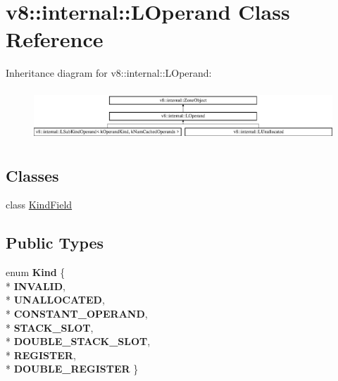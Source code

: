 \hypertarget{classv8_1_1internal_1_1_l_operand}{}\section{v8\+:\+:internal\+:\+:L\+Operand Class Reference}
\label{classv8_1_1internal_1_1_l_operand}
Inheritance diagram for v8\+:\+:internal\+:\+:L\+Operand\+:\begin{figure}[H]
\begin{center}
\leavevmode
\includegraphics[height=1.922197cm]{classv8_1_1internal_1_1_l_operand}
\end{center}
\end{figure}
\subsection*{Classes}
\begin{DoxyCompactItemize}
\item 
class \hyperlink{classv8_1_1internal_1_1_l_operand_1_1_kind_field}{Kind\+Field}
\end{DoxyCompactItemize}
\subsection*{Public Types}
\begin{DoxyCompactItemize}
\item 
enum {\bfseries Kind} \{ \\*
{\bfseries I\+N\+V\+A\+L\+ID}, 
\\*
{\bfseries U\+N\+A\+L\+L\+O\+C\+A\+T\+ED}, 
\\*
{\bfseries C\+O\+N\+S\+T\+A\+N\+T\+\_\+\+O\+P\+E\+R\+A\+ND}, 
\\*
{\bfseries S\+T\+A\+C\+K\+\_\+\+S\+L\+OT}, 
\\*
{\bfseries D\+O\+U\+B\+L\+E\+\_\+\+S\+T\+A\+C\+K\+\_\+\+S\+L\+OT}, 
\\*
{\bfseries R\+E\+G\+I\+S\+T\+ER}, 
\\*
{\bfseries D\+O\+U\+B\+L\+E\+\_\+\+R\+E\+G\+I\+S\+T\+ER}
 \}\hypertarget{classv8_1_1internal_1_1_l_operand_a0a6ec67e6248454953fad3a633ecf53c}{}\label{classv8_1_1internal_1_1_l_operand_a0a6ec67e6248454953fad3a633ecf53c}

\end{DoxyCompactItemize}
